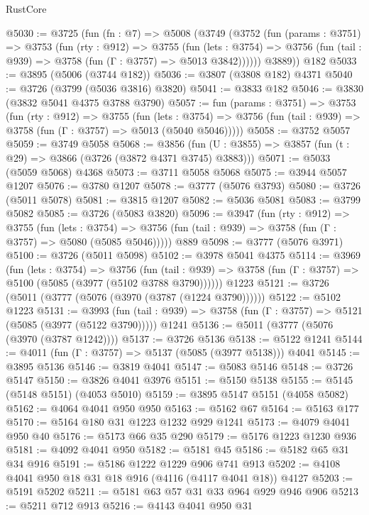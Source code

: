 \begin{lexlean}{RustCore}
\begin{coremodule}
@5030 := @3725
    (fun (fn : @7) =>
    @5008
      (@3749
        (@3752
          (fun (params : @3751) =>
          @3753
            (fun (rty : @912) =>
            @3755
              (fun (lets : @3754) =>
              @3756 (fun (tail : @939) => @3758 (fun (Γ : @3757) => @5013 @3842))))))
        @3889))
    @182
@5033 := @3895 (@5006 (@3744 @182))
@5036 := @3807 (@3808 @182) @4371
@5040 := @3726 (@3799 (@5036 @3816) @3820)
@5041 := @3833 @182
@5046 := @3830 (@3832 @5041 @4375 @3788 @3790)
@5057 := fun (params : @3751) =>
  @3753
    (fun (rty : @912) =>
    @3755
      (fun (lets : @3754) =>
      @3756 (fun (tail : @939) => @3758 (fun (Γ : @3757) => @5013 (@5040 @5046)))))
@5058 := @3752 @5057
@5059 := @3749 @5058
@5068 := @3856 (fun (U : @3855) => @3857 (fun (t : @29) => @3866 (@3726 (@3872 @4371 @3745) @3883)))
@5071 := @5033 (@5059 @5068) @4368
@5073 := @3711 @5058 @5068
@5075 := @3944 @5057 @1207
@5076 := @3780 @1207
@5078 := @3777 (@5076 @3793)
@5080 := @3726 (@5011 @5078)
@5081 := @3815 @1207
@5082 := @5036 @5081
@5083 := @3799 @5082
@5085 := @3726 (@5083 @3820)
@5096 := @3947
    (fun (rty : @912) =>
    @3755
      (fun (lets : @3754) =>
      @3756 (fun (tail : @939) => @3758 (fun (Γ : @3757) => @5080 (@5085 @5046)))))
    @889
@5098 := @3777 (@5076 @3971)
@5100 := @3726 (@5011 @5098)
@5102 := @3978 @5041 @4375
@5114 := @3969
    (fun (lets : @3754) =>
    @3756
      (fun (tail : @939) => @3758 (fun (Γ : @3757) => @5100 (@5085 (@3977 (@5102 @3788 @3790))))))
    @1223
@5121 := @3726 (@5011 (@3777 (@5076 (@3970 (@3787 (@1224 @3790))))))
@5122 := @5102 @1223
@5131 := @3993
    (fun (tail : @939) => @3758 (fun (Γ : @3757) => @5121 (@5085 (@3977 (@5122 @3790)))))
    @1241
@5136 := @5011 (@3777 (@5076 (@3970 (@3787 @1242))))
@5137 := @3726 @5136
@5138 := @5122 @1241
@5144 := @4011 (fun (Γ : @3757) => @5137 (@5085 (@3977 @5138))) @4041
@5145 := @3895 @5136
@5146 := @3819 @4041
@5147 := @5083 @5146
@5148 := @3726 @5147
@5150 := @3826 @4041 @3976
@5151 := @5150 @5138
@5155 := @5145 (@5148 @5151) (@4053 @5010)
@5159 := @3895 @5147 @5151 (@4058 @5082)
@5162 := @4064 @4041 @950 @950
@5163 := @5162 @67
@5164 := @5163 @177
@5170 := @5164 @180 @31 @1223 @1232 @929 @1241
@5173 := @4079 @4041 @950 @40
@5176 := @5173 @66 @35 @290
@5179 := @5176 @1223 @1230 @936
@5181 := @4092 @4041 @950
@5182 := @5181 @45
@5186 := @5182 @65 @31 @34 @916
@5191 := @5186 @1222 @1229 @906 @741 @913
@5202 := @4108 @4041 @950 @18 @31 @18 @916 (@4116 (@4117 @4041 @18)) @4127
@5203 := @5191 @5202
@5211 := @5181 @63 @57 @31 @33 @964 @929 @946 @906
@5213 := @5211 @712 @913
@5216 := @4143 @4041 @950 @31

\end{coremodule}
\end{lexlean}
